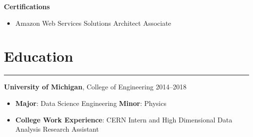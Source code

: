 \documentclass[11pt]{article}
\newcommand{\resumesection}[1]{\vspace{-0.5cm}\section*{\LARGE#1}\vspace{-0.2cm}\hrule\vspace{0.2cm}}
\begin{document}
\textbf{Certifications}
\begin{itemize}
  \item{Amazon Web Services Solutions Architect Associate}
\end{itemize}

\resumesection{Education}

\textbf{University of Michigan}, College of Engineering \hfill 2014--2018

\begin{itemize}
  \item \textbf{Major}: Data Science Engineering \textbf{Minor}: Physics
  \item \textbf{College Work Experience}: CERN Intern and High Dimensional Data Analysis Research Assistant
\end{itemize}




\end{document}
